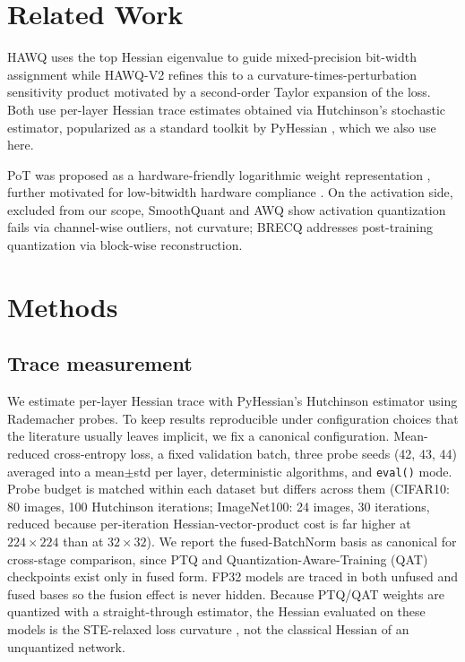 \documentclass{article}
\begin{document}
\section{Related Work}

HAWQ \citep{dong_hawq_2019} uses the top Hessian eigenvalue to guide mixed-precision bit-width assignment while HAWQ-V2 \citep{dong_hawqv2_2020} refines this to a curvature-times-perturbation sensitivity product motivated by a second-order Taylor expansion of the loss. Both use per-layer Hessian trace estimates obtained via Hutchinson's stochastic estimator, popularized as a standard toolkit by PyHessian \citep{yao_pyhessian_2020}, which we also use here.

PoT was proposed as a hardware-friendly logarithmic weight representation \citep{miyashita_pot_2016}, further motivated for low-bitwidth hardware compliance \citep{przewlocka_rus_pot_2022}. On the activation side, excluded from our scope, SmoothQuant \citep{xiao_smoothquant_2023} and AWQ \citep{lin_awq_2024} show activation quantization fails via channel-wise outliers, not curvature; BRECQ \citep{li_brecq_2021} addresses post-training quantization via block-wise reconstruction.

\section{Methods}

\subsection{Trace measurement}
We estimate per-layer Hessian trace with PyHessian's Hutchinson estimator \citep{yao_pyhessian_2020} using Rademacher probes. To keep results reproducible under configuration choices that the literature usually leaves implicit, we fix a canonical configuration. Mean-reduced cross-entropy loss, a fixed validation batch, three probe seeds (42, 43, 44) averaged into a mean$\pm$std per layer, deterministic algorithms, and \texttt{eval()} mode. Probe budget is matched within each dataset but differs across them (CIFAR10: 80 images, 100 Hutchinson iterations; ImageNet100: 24 images, 30 iterations, reduced because per-iteration Hessian-vector-product cost is far higher at $224\times224$ than at $32\times32$). We report the fused-BatchNorm basis as canonical for cross-stage comparison, since PTQ and Quantization-Aware-Training (QAT) checkpoints exist only in fused form. FP32 models are traced in both unfused and fused bases so the fusion effect is never hidden. Because PTQ/QAT weights are quantized with a straight-through estimator, the Hessian evaluated on these models is the STE-relaxed loss curvature \citep{bengio_ste_2013}, not the classical Hessian of an unquantized network.
\end{document}
